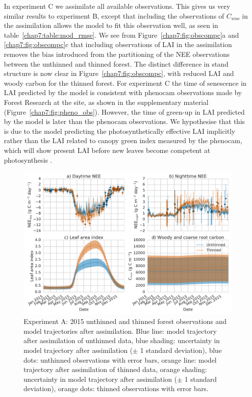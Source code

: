 In experiment C we assimilate all available observations. This gives us very similar results to experiment B, except that including the observations of \(C_{woo}\) in the assimilation allows the model to fit this observation well, as seen in table~\ref{chap7:table:mod_rmse}. We see from Figure~\ref{chap7:fig:obscompc}a and \ref{chap7:fig:obscompc}c that including observations of LAI in the assimilation removes the bias introduced from the partitioning of the NEE observations between the unthinned and thinned forest. The distinct difference in stand structure is now clear in Figure~\ref{chap7:fig:obscompc}, with reduced LAI and woody carbon for the thinned forest. For experiment C the time of senescence in LAI predicted by the model is consistent with phenocam observations made by Forest Research at the site, as shown in the supplementary material (Figure~\ref{chap7:fig:pheno_obs}). However, the time of green-up in LAI predicted by the model is later than the phenocam observations. We hypothesise that this is due to the model predicting the photosynthetically effective LAI implicitly rather than the LAI related to canopy green index measured by the phenocam, which will show present LAI before new leaves become competent at photosynthesis \citep{reich1991leaf, Morecroft2003}.   

\begin{figure}[ht]
    \centering
        \includegraphics[width=\textwidth]{chapter/chapter7/obs_compa.pdf}
\caption{Experiment A: 2015 unthinned and thinned forest observations and model trajectories after assimilation. Blue line: model trajectory after assimilation of unthinned data, blue shading: uncertainty in model trajectory after assimilation (\(\pm\) 1 standard deviation), blue dots: unthinned observations with error bars, orange line: model trajectory after assimilation of thinned data, orange shading: uncertainty in model trajectory after assimilation (\(\pm\) 1 standard deviation), orange dots: thinned observations with error bars.}
 \label{chap7:fig:obscompa}
 \end{figure}
 
